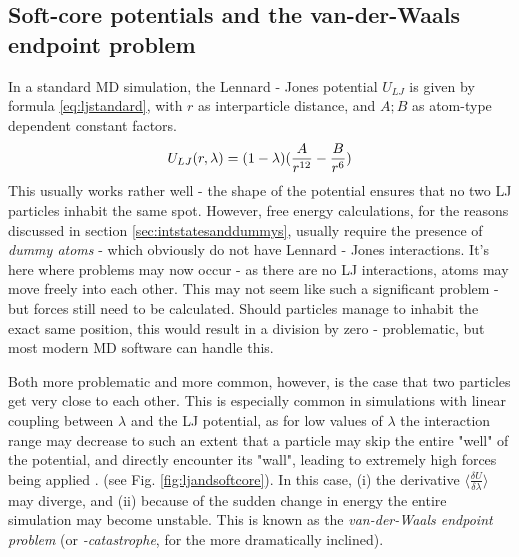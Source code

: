 \documentclass[oneside]{scrreprt}
\begin{document}
\subsection{Soft-core potentials and the van-der-Waals endpoint problem} \label{sec:vdwproblem}
In a standard MD simulation, the Lennard - Jones potential $U_{LJ}$ is given by formula \ref{eq:ljstandard}, with $r$ as interparticle distance, and $A;B$ as atom-type dependent constant factors.
\begin{equation}
U_{LJ}(r,\lambda)=(1-\lambda)(\frac{A}{r^{12}} - \frac{B}{r^6}) \label{eq:ljstandard} \\
\end{equation}
This usually works rather well -  the shape of the potential ensures that no two LJ particles inhabit the same spot. However, free energy calculations, for the reasons discussed in section \ref{sec:intstatesanddummys}, usually require the presence of \textit{dummy atoms} - which obviously do not have Lennard - Jones interactions. It's here where problems may now occur -  as there are no LJ interactions, atoms may move freely into each other. This may not seem like such a significant problem - but forces still need to be calculated. Should particles manage to inhabit the exact same position, this would result in a division by zero - problematic, but most modern MD software can handle this. 


Both more problematic and more common, however, is the case that two particles get very close to each other. This is especially common in simulations with linear coupling between $\lambda$ and the LJ potential, as for low values of $\lambda$ the interaction range may decrease to such an extent that a particle may skip the entire "well" of the potential, and directly encounter its "wall", leading to extremely high forces being applied \cite{boresch_avoiding_2011}. (see Fig. \ref{fig:ljandsoftcore}). In this case, (i) the derivative $\langle \frac{\delta U}{\delta\lambda} \rangle$ may diverge, and (ii) because of the sudden change in energy the entire simulation may become unstable. This is known as the \textit{van-der-Waals endpoint problem} (or \textit{-catastrophe}, for the more dramatically inclined).
\end{document}
